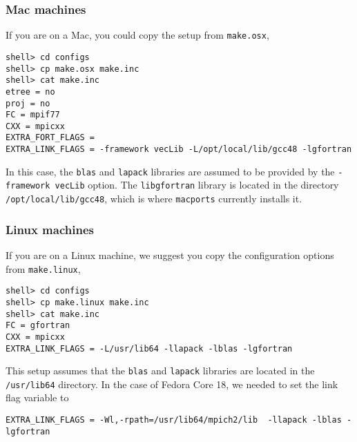 \documentclass[11pt]{article}
\begin{document}
\subsubsection{Mac machines}
If you are on a Mac, you could copy the setup from \verb+make.osx+,
\begin{verbatim}
shell> cd configs
shell> cp make.osx make.inc
shell> cat make.inc
etree = no
proj = no
FC = mpif77
CXX = mpicxx
EXTRA_FORT_FLAGS = 
EXTRA_LINK_FLAGS = -framework vecLib -L/opt/local/lib/gcc48 -lgfortran
\end{verbatim}
In this case, the \verb+blas+ and \verb+lapack+ libraries are assumed to be provided by the
\verb+-framework vecLib+ option. The \verb+libgfortran+ library is located in the directory
\verb+/opt/local/lib/gcc48+, which is where \verb+macports+ currently installs it.

\subsubsection{Linux machines}
If you are on a Linux machine, we suggest you copy the configuration options from \verb+make.linux+,
\begin{verbatim}
shell> cd configs
shell> cp make.linux make.inc
shell> cat make.inc
FC = gfortran
CXX = mpicxx
EXTRA_LINK_FLAGS = -L/usr/lib64 -llapack -lblas -lgfortran
\end{verbatim}
This setup assumes that the \verb+blas+ and \verb+lapack+ libraries are located in the
\verb+/usr/lib64+ directory. 
In the case of Fedora Core 18, we needed to set the link flag variable to
\begin{verbatim}
EXTRA_LINK_FLAGS = -Wl,-rpath=/usr/lib64/mpich2/lib  -llapack -lblas -lgfortran
\end{verbatim}
\end{document}
